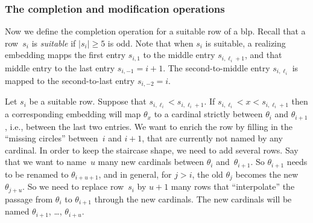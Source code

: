 \documentclass{article}
\theoremstyle{definition}
\theoremstyle{remark}
\begin{document}





\subsubsection*{The completion and modification operations}



Now we define the completion operation for a suitable row of a blp. Recall that a row~$s_i$ is \emph{suitable} if $|s_i|\ge 5$ is odd. Note that when $s_i$ is suitable, a realizing embedding mapps the first entry $s_{i,1}$ to the middle entry $s_{i,\ell_i+1}$, and that middle entry to the last entry $s_{i,-1} = i+1$. The second-to-middle entry $s_{i,\ell_i}$ is mapped to the second-to-last entry $s_{i,-2} = i$.

Let $s_i$ be a suitable row. Suppose that $s_{i,\ell_i}< s_{i,\ell_i+1}$. If $s_{i,\ell_i} < x < s_{i,\ell_i+1}$ then a corresponding embedding will map $\theta_x$ to a cardinal strictly between $\theta_{i}$ and $\theta_{i+1}$, i.e., between the last two entries. We want to enrich the row by filling in the ``missing circles'' between~$i$ and $i+1$, that are currently not named by any cardinal. In order to keep the staircase shape, we need to add several rows. Say that we want to name~$u$ many new cardinals between $\theta_i$ and~$\theta_{i+1}$. So $\theta_{i+1}$ needs to be renamed to $\theta_{i+u+1}$, and in general, for $j>i$, the old $\theta_j$ becomes the new $\theta_{j+u}$. So we need to replace row~$s_i$ by $u+1$ many rows that ``interpolate'' the passage from $\theta_i$ to $\theta_{i+1}$ through the new cardinals. The new cardinals will be named $\theta_{i+1}$, \dots, $\theta_{i+u}$.
\end{document}

